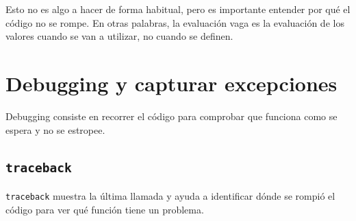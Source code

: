 \documentclass{config/apuntes}\usepackage[]{graphicx}\usepackage[]{xcolor}
\newcommand{\code}[1]{\texttt{#1}}
\begin{document}
Esto no es algo a hacer de forma habitual, pero es importante entender por qué el código no se rompe. En otras palabras, la evaluación vaga es la evaluación de los valores cuando se van a utilizar, no cuando se definen.

\chapter{Debugging y capturar excepciones}
Debugging consiste en recorrer el código para comprobar que funciona como se espera y no se estropee. 

\section{\code{traceback}}
\code{traceback} muestra la última llamada y ayuda a identificar dónde se rompió el código para ver qué función tiene un problema. 
\end{document}
